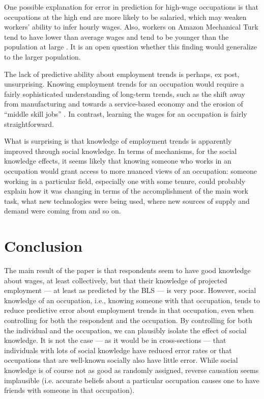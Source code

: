 \documentclass[11pt]{article}
\begin{document}
One possible explanation for error in prediction for high-wage occupations is that occupations at the high end are more likely to be salaried, which may weaken workers' ability to infer hourly wages. 
Also, workers on Amazon Mechanical Turk tend to have lower than average wages and tend to be younger than the population at large \citep{Berinsky2012, ipeirotis2010demographics}. 
It is an open question whether this finding would generalize to the larger population. 

The lack of predictive ability about employment trends is perhaps, ex post, unsurprising. 
Knowing employment trends for an occupation would require a fairly sophisticated understanding of long-term trends, such as the shift away from manufacturing and towards a service-based economy and the erosion of ``middle skill jobs'' \citep{autor1998computing}.  
In contrast, learning the wages for an occupation is fairly straightforward. 

What is surprising is that knowledge of employment trends is apparently improved through social knowledge. 
In terms of mechanisms, for the social knowledge effects, it seems likely that knowing someone who works in an occupation would grant access to more nuanced views of an occupation:
someone working in a particular field, especially one with some tenure, could probably explain how it was changing in terms of the accomplishment of the main work task, what new technologies were being used, where new sources of supply and demand were coming from and so on.  

\section{Conclusion} 

The main result of the paper is that respondents seem to have good knowledge about wages, at least collectively, but that their knowledge of projected employment --- at least as predicted by the BLS --- is very poor.
However, social knowledge of an occupation, i.e., knowing someone with that occupation, tends to reduce predictive error about employment trends in that occupation, even when controlling for both the respondent and the occupation. 
By controlling for both the individual and the occupation, we can plausibly isolate the effect of social knowledge. 
It is not the case --- as it would be in cross-sections --- that individuals with lots of social knowledge have reduced error rates or that occupations that are well-known socially also have little error. 
While social knowledge is of course not as good as randomly assigned, reverse causation seems implausible (i.e. accurate beliefs about a particular occupation causes one to have friends with someone in that occupation). 
\end{document}
